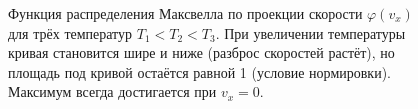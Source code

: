 \begin{figure}[htbp]
\begin{tikzpicture}[
        scale=1.1,
        >=Stealth,
        font=\small,
        thick
    ]
    \end{tikzpicture}
    \caption{Функция распределения Максвелла по проекции скорости $\varphi(v_x)$ для трёх температур $T_1 < T_2 < T_3$. При увеличении температуры кривая становится шире и ниже (разброс скоростей растёт), но площадь под кривой остаётся равной 1 (условие нормировки). Максимум всегда достигается при $v_x = 0$.}
    \label{fig:maxwell_vx_distribution}
\end{figure}

